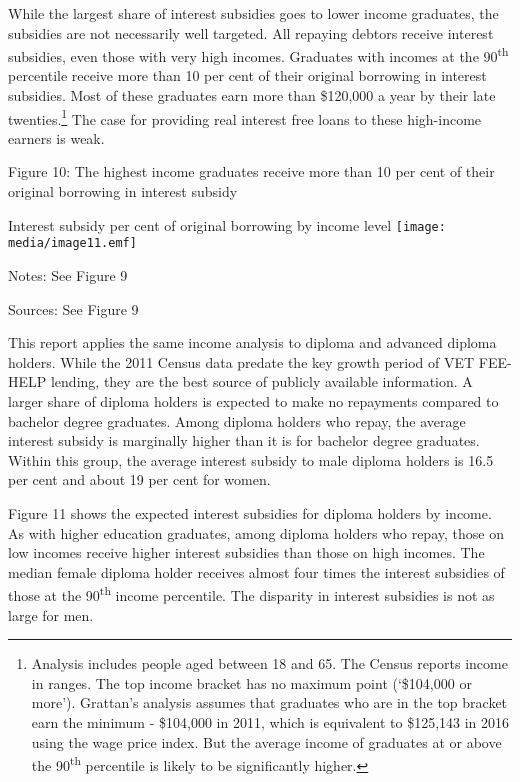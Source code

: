 \documentclass[]{book}
\begin{document}
While the largest share of interest subsidies goes to lower income graduates, the subsidies are not necessarily well targeted. All repaying debtors receive interest subsidies, even those with very high incomes. Graduates with incomes at the 90\textsuperscript{th} percentile receive more than 10 per cent of their original borrowing in interest subsidies. Most of these graduates earn more than \$120,000 a year by their late twenties.\footnote{Analysis includes people aged between 18 and 65. The Census reports income in ranges. The top income bracket has no maximum point (`\$104,000 or more'). Grattan's analysis assumes that graduates who are in the top bracket earn the minimum - \$104,000 in 2011, which is equivalent to \$125,143 in 2016 using the wage price index. But the average income of graduates at or above the 90\textsuperscript{th} percentile is likely to be significantly higher.} The case for providing real interest free loans to these high-income earners is weak.

\protect\hypertarget{_Ref335491600}{}{}Figure 10: The highest income graduates receive more than 10 per cent of their original borrowing in interest subsidy

Interest subsidy per cent of original borrowing by income level \texttt{[image: media/image11.emf]}

Notes: See Figure 9

Sources: See Figure 9

\protect\hypertarget{_Ref312571851}{}{}This report applies the same income analysis to diploma and advanced diploma holders. While the 2011 Census data predate the key growth period of VET FEE-HELP lending, they are the best source of publicly available information. A larger share of diploma holders is expected to make no repayments compared to bachelor degree graduates. Among diploma holders who repay, the average interest subsidy is marginally higher than it is for bachelor degree graduates. Within this group, the average interest subsidy to male diploma holders is 16.5 per cent and about 19 per cent for women.

Figure 11 shows the expected interest subsidies for diploma holders by income. As with higher education graduates, among diploma holders who repay, those on low incomes receive higher interest subsidies than those on high incomes. The median female diploma holder receives almost four times the interest subsidies of those at the 90\textsuperscript{th} income percentile. The disparity in interest subsidies is not as large for men.
\end{document}
